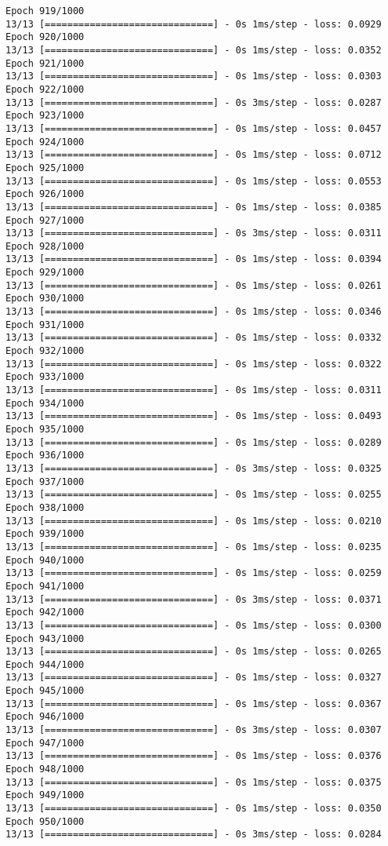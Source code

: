 \documentclass[11pt]{article}
\begin{document}
\begin{Verbatim}[commandchars=\\\{\}]
Epoch 919/1000
13/13 [==============================] - 0s 1ms/step - loss: 0.0929
Epoch 920/1000
13/13 [==============================] - 0s 1ms/step - loss: 0.0352
Epoch 921/1000
13/13 [==============================] - 0s 1ms/step - loss: 0.0303
Epoch 922/1000
13/13 [==============================] - 0s 3ms/step - loss: 0.0287
Epoch 923/1000
13/13 [==============================] - 0s 1ms/step - loss: 0.0457
Epoch 924/1000
13/13 [==============================] - 0s 1ms/step - loss: 0.0712
Epoch 925/1000
13/13 [==============================] - 0s 1ms/step - loss: 0.0553
Epoch 926/1000
13/13 [==============================] - 0s 1ms/step - loss: 0.0385
Epoch 927/1000
13/13 [==============================] - 0s 3ms/step - loss: 0.0311
Epoch 928/1000
13/13 [==============================] - 0s 1ms/step - loss: 0.0394
Epoch 929/1000
13/13 [==============================] - 0s 1ms/step - loss: 0.0261
Epoch 930/1000
13/13 [==============================] - 0s 1ms/step - loss: 0.0346
Epoch 931/1000
13/13 [==============================] - 0s 1ms/step - loss: 0.0332
Epoch 932/1000
13/13 [==============================] - 0s 1ms/step - loss: 0.0322
Epoch 933/1000
13/13 [==============================] - 0s 1ms/step - loss: 0.0311
Epoch 934/1000
13/13 [==============================] - 0s 1ms/step - loss: 0.0493
Epoch 935/1000
13/13 [==============================] - 0s 1ms/step - loss: 0.0289
Epoch 936/1000
13/13 [==============================] - 0s 3ms/step - loss: 0.0325
Epoch 937/1000
13/13 [==============================] - 0s 1ms/step - loss: 0.0255
Epoch 938/1000
13/13 [==============================] - 0s 1ms/step - loss: 0.0210
Epoch 939/1000
13/13 [==============================] - 0s 1ms/step - loss: 0.0235
Epoch 940/1000
13/13 [==============================] - 0s 1ms/step - loss: 0.0259
Epoch 941/1000
13/13 [==============================] - 0s 3ms/step - loss: 0.0371
Epoch 942/1000
13/13 [==============================] - 0s 1ms/step - loss: 0.0300
Epoch 943/1000
13/13 [==============================] - 0s 1ms/step - loss: 0.0265
Epoch 944/1000
13/13 [==============================] - 0s 1ms/step - loss: 0.0327
Epoch 945/1000
13/13 [==============================] - 0s 1ms/step - loss: 0.0367
Epoch 946/1000
13/13 [==============================] - 0s 3ms/step - loss: 0.0307
Epoch 947/1000
13/13 [==============================] - 0s 1ms/step - loss: 0.0376
Epoch 948/1000
13/13 [==============================] - 0s 1ms/step - loss: 0.0375
Epoch 949/1000
13/13 [==============================] - 0s 1ms/step - loss: 0.0350
Epoch 950/1000
13/13 [==============================] - 0s 3ms/step - loss: 0.0284

\end{Verbatim}
\end{document}
